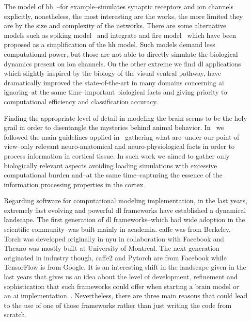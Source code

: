 \documentclass[11pt,a4paper]{article}
\begin{document}
The model of \gls{hh}~\cite{HODGKIN199025}--for example--simulates synaptic receptors and ion channels explicitly, nonetheless, the most interesting are the works, the more limited they are by the size and complexity of the networks. There are some alternative models such as spiking model~\cite{Izhikevich2004SpiketimingDO} and integrate and fire model~\cite{1333071} which have been proposed as a simplification of the \gls{hh} model. Such models demand less computational power, but those are not able to directly simulate the biological dynamics present on ion channels. On the other extreme we find \gls{dl} applications~\cite{lecun_deep_2015} which slightly inspired by the biology of the visual ventral pathway, have dramatically improved the state-of-the-art in many domains concerning \gls{ai} ignoring--at the same time--important biological facts and giving priority to computational efficiency and classification accuracy. 

Finding the appropriate level of detail in modeling the brain seems to be the holy grail in order to disentangle the mysteries behind animal behavior. In~\cite{Dematties2018} we followed the main guidelines applied in~\cite{10.3389/fncir.2016.00023} gathering what are--under our point of view--only relevant neuro-anatomical and neuro-physiological facts in order to process information in cortical tissue. In such work we aimed to gather only biologically relevant aspects avoiding loading simulations with excessive computational burden and--at the same time--capturing the essence of the information processing properties in the cortex.

Regarding software for computational modeling implementation, in the last years, extremely fast evolving and powerful \gls{dl} frameworks have established a dynamical landscape. The first generation of \gls{dl} frameworks--which had wide adoption in the scientific community--was built mainly in academia. \gls{caffe} was from Berkeley, Torch was developed originally in \gls{nyu} in collaboration with Facebook and Theano was mostly built at University of Montreal. The next generation originated in industry though, \gls{caffe}2 and Pytorch are from Facebook while TensorFlow is from Google. It is an interesting shift in the landscape given in the last years that gives us an idea about the level of development, refinement and sophistication that such frameworks could offer when starting a brain model or an \gls{ai} implementation~\cite{Bahrampour2015ComparativeSO,7979887}. Nevertheless, there are three main reasons that could lead to the use of one of those frameworks rather than just writing the code from scratch. 
\end{document}
